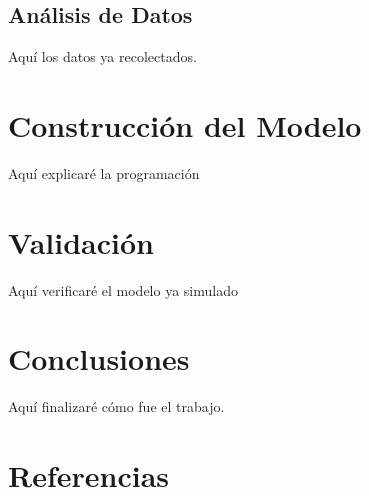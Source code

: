 \documentclass{article}
\begin{document}
 \subsection{Análisis de Datos}	
	Aquí los datos ya recolectados.
	
\section{Construcción del Modelo}
	Aquí explicaré la programación
\section{Validación}
	Aquí verificaré el modelo ya simulado
\section{Conclusiones}
	Aquí finalizaré cómo fue el trabajo.
	
\section{Referencias}

\printbibliography
\end{document}
